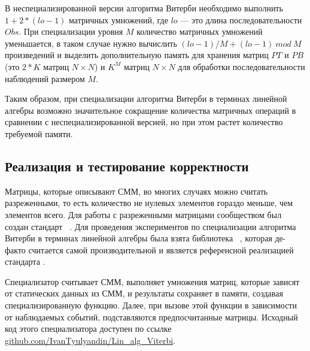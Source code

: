 В неспециализированной версии алгоритма Витерби необходимо 
выполнить $1 + 2 * (lo - 1)$ матричных умножений, где $lo$ 
--- это длина последовательности $Obs$.
При специализации уровня $M$ количество 
матричных умножений уменьшается, в таком случае нужно 
вычислить $\mathit{(lo - 1) / M + (lo - 1)\ mod\ M}$ 
произведений и выделить дополнительную память для хранения 
матриц $PT$ и $PB$ (это $2 * K$ матриц $N \times N$) и $K^{M}$ матриц $N 
\times N$ для обработки последовательности наблюдений 
размером $M$.

Таким образом, при специализации алгоритма Витерби в 
терминах линейной алгебры возможно значительное сокращение 
количества матричных операций в сравнении с 
неспециализированной версией, но при этом растет количество 
требуемой памяти.

\subsection{Реализация и тестирование  корректности}
Матрицы, которые описывают СММ, во многих случаях можно 
считать разреженными, то есть количество не нулевых элементов 
гораздо меньше, чем элементов всего.
Для работы с разреженными матрицами сообществом был создан 
стандарт ~\cite{GraphBLAS}.
Для проведения экспериментов по специализации алгоритма 
Витерби в терминах линейной алгебры была взята библиотека 
~\cite{SuiteSparse}, 
которая де-факто считается самой производительной и является 
референсной реализацией стандарта .

Специализатор считывает СММ, выполняет умножения матриц, 
которые зависят от статических данных из СММ, и результаты 
сохраняет в памяти, создавая специализированную функцию.
Далее, при вызове этой функции в зависимости от наблюдаемых 
событий, подставляются предпосчитанные матрицы.
Исходный код этого специализатора доступен по ссылке 
\href{https://github.com/IvanTyulyandin/Lin_alg_Viterbi}
{github.com/IvanTyulyandin/Lin\_alg\_Viterbi}.